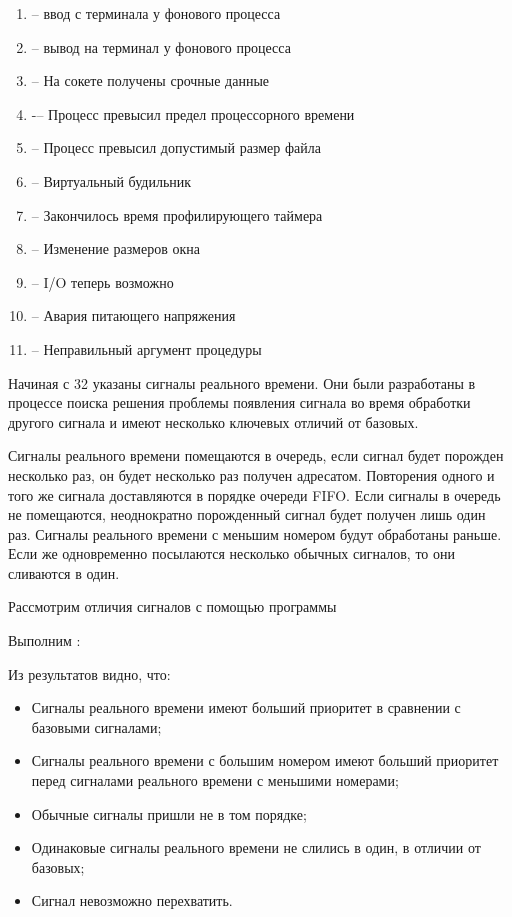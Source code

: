 \begin{enumerate}[itemsep=-0.2em]
	\item {} -- ввод с терминала у фонового процесса
	\item {} -- вывод на терминал у фонового процесса
	\item {} -- На сокете получены срочные данные
	\item {} -– Процесс превысил предел процессорного времени
	\item {} -- Процесс превысил допустимый размер файла
	\item {} -- Виртуальный будильник
	\item {} -- Закончилось время профилирующего таймера
	\item {} -- Изменение размеров окна
	\item {} -- I/O теперь возможно
	\item {} -- Авария питающего напряжения
	\item {} -- Неправильный аргумент процедуры
\end{enumerate}

Начиная с 32 указаны сигналы реального времени. Они были разработаны в процессе поиска решения проблемы появления сигнала во время обработки другого сигнала и имеют несколько ключевых отличий от базовых.

Сигналы реального времени помещаются в очередь, если сигнал будет порожден несколько раз, он будет несколько раз получен адресатом. Повторения одного и того же сигнала доставляются в порядке очереди FIFO. Если сигналы в очередь не помещаются, неоднократно порожденный сигнал будет получен лишь один раз. Сигналы реального времени с меньшим номером будут обработаны раньше. Если же одновременно посылаются несколько обычных сигналов, то они сливаются в один.

Рассмотрим отличия сигналов с помощью программы 



Выполним :



Из результатов видно, что:
\begin{itemize}
	\item Сигналы реального времени имеют больший приоритет в сравнении с базовыми сигналами;
	\item Сигналы реального времени с большим номером имеют больший приоритет перед сигналами реального времени с меньшими номерами;
	\item Обычные сигналы пришли не в том порядке;
	\item Одинаковые сигналы реального времени не слились в один, в отличии от базовых;
	\item Сигнал  невозможно перехватить.
\end{itemize}

